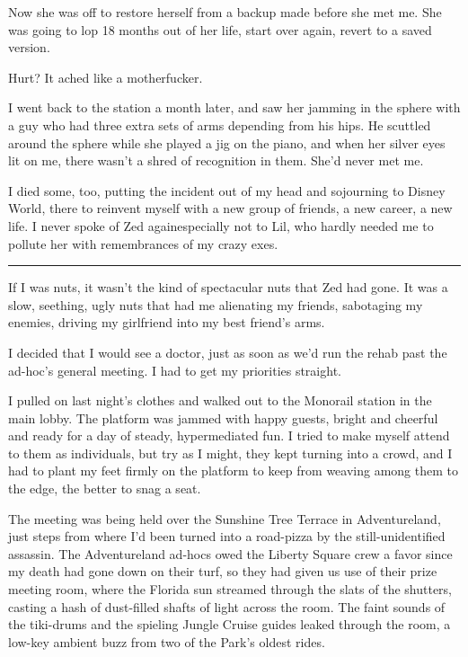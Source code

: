 Now she was off to restore herself from a backup made before she
met me. She was going to lop 18 months out of her life, start over
again, revert to a saved version.

Hurt? It ached like a motherfucker.

I went back to the station a month later, and saw her jamming in
the sphere with a guy who had three extra sets of arms depending
from his hips. He scuttled around the sphere while she played a jig
on the piano, and when her silver eyes lit on me, there wasn't a
shred of recognition in them. She'd never met me.

I died some, too, putting the incident out of my head and
sojourning to Disney World, there to reinvent myself with a new
group of friends, a new career, a new life. I never spoke of Zed
again{\dash}especially not to Lil, who hardly needed me to pollute her
with remembrances of my crazy exes.

\begin{center}\rule{1in}{0.4pt}\end{center}

If I was nuts, it wasn't the kind of spectacular nuts that Zed had
gone. It was a slow, seething, ugly nuts that had me alienating my
friends, sabotaging my enemies, driving my girlfriend into my best
friend's arms.

I decided that I would see a doctor, just as soon as we'd run the
rehab past the ad-hoc's general meeting. I had to get my priorities
straight.

I pulled on last night's clothes and walked out to the Monorail
station in the main lobby. The platform was jammed with happy
guests, bright and cheerful and ready for a day of steady,
hypermediated fun. I tried to make myself attend to them as
individuals, but try as I might, they kept turning into a crowd,
and I had to plant my feet firmly on the platform to keep from
weaving among them to the edge, the better to snag a seat.

The meeting was being held over the Sunshine Tree Terrace in
Adventureland, just steps from where I'd been turned into a
road-pizza by the still-unidentified assassin. The Adventureland
ad-hocs owed the Liberty Square crew a favor since my death had
gone down on their turf, so they had given us use of their prize
meeting room, where the Florida sun streamed through the slats of
the shutters, casting a hash of dust-filled shafts of light across
the room. The faint sounds of the tiki-drums and the spieling
Jungle Cruise guides leaked through the room, a low-key ambient
buzz from two of the Park's oldest rides.

